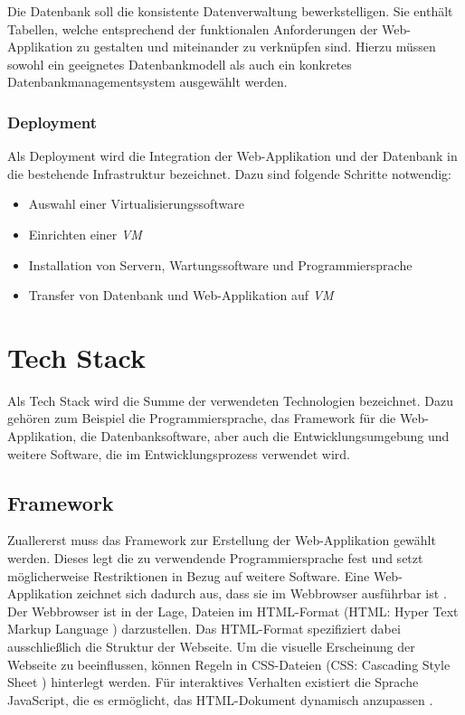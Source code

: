 \documentclass[
]{article}
\providecommand{\tightlist}{%
  \setlength{\itemsep}{0pt}\setlength{\parskip}{0pt}}
\begin{document}
Die Datenbank soll die konsistente Datenverwaltung bewerkstelligen. Sie enthält Tabellen, welche entsprechend der funktionalen Anforderungen der Web-Applikation zu gestalten und miteinander zu verknüpfen sind. Hierzu müssen sowohl ein geeignetes Datenbankmodell als auch ein konkretes Datenbankmanagementsystem ausgewählt werden.

\hypertarget{deployment}{%
\subsubsection{Deployment}\label{deployment}}

Als Deployment wird die Integration der Web-Applikation und der Datenbank in die bestehende Infrastruktur bezeichnet. Dazu sind folgende Schritte notwendig:

\begin{itemize}
\tightlist
\item
  Auswahl einer Virtualisierungssoftware
\item
  Einrichten einer \emph{VM}
\item
  Installation von Servern, Wartungssoftware und Programmiersprache
\item
  Transfer von Datenbank und Web-Applikation auf \emph{VM}
\end{itemize}

\hypertarget{tech-stack}{%
\section{Tech Stack}\label{tech-stack}}

Als Tech Stack wird die Summe der verwendeten Technologien bezeichnet. Dazu gehören zum Beispiel die Programmiersprache, das Framework für die Web-Applikation, die Datenbanksoftware, aber auch die Entwicklungsumgebung und weitere Software, die im Entwicklungsprozess verwendet wird.\autocite{techstack}

\hypertarget{framework}{%
\subsection{Framework}\label{framework}}

Zuallererst muss das Framework zur Erstellung der Web-Applikation gewählt werden. Dieses legt die zu verwendende Programmiersprache fest und setzt möglicherweise Restriktionen in Bezug auf weitere Software. Eine Web-Applikation zeichnet sich dadurch aus, dass sie im Webbrowser ausführbar ist \autocite{webappdef}. Der Webbrowser ist in der Lage, Dateien im HTML-Format (HTML: Hyper Text Markup Language \autocite{html}) darzustellen. Das HTML-Format spezifiziert dabei ausschließlich die Struktur der Webseite. Um die visuelle Erscheinung der Webseite zu beeinflussen, können Regeln in CSS-Dateien (CSS: Cascading Style Sheet \autocite{css}) hinterlegt werden. Für interaktives Verhalten existiert die Sprache JavaScript, die es ermöglicht, das HTML-Dokument dynamisch anzupassen \autocite{javascript}.
\end{document}
